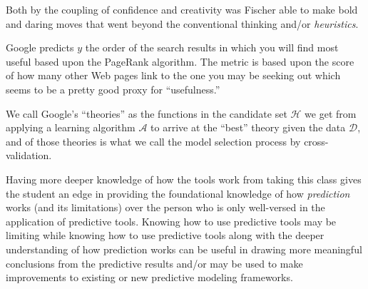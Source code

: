 \documentclass[12pt]{article}
\begin{document}
\begin{enumerate}

\begin{tcolorbox}[colback=white, sharp corners]
Both by the coupling of confidence and creativity was Fischer able to make bold and daring moves that went beyond the conventional thinking and/or \emph{heuristics}.
\end{tcolorbox}



\begin{tcolorbox}[colback=white, sharp corners]
Google predicts $y$ the order of the search results in which you will find most useful based upon the PageRank algorithm. The metric is based upon the score of how many other Web pages link to the one you may be seeking out which seems to be a pretty good proxy for ``usefulness.''
\end{tcolorbox}



\begin{tcolorbox}[colback=white, sharp corners]
We call Google's ``theories'' as the functions in the candidate set $\mathcal{H}$ we get from applying a learning algorithm $\mathcal{A}$ to arrive at the ``best'' theory given the data $\mathcal{D}$, and  of those theories is what we call the model selection process by cross-validation. 
\end{tcolorbox}



\begin{tcolorbox}[colback=white, sharp corners]
Having more deeper knowledge of how the tools work from taking this class gives the student an edge in providing the foundational knowledge of how \emph{prediction} works (and its limitations) over the person who is only well-versed in the application of predictive tools. Knowing how to use predictive tools may be limiting while knowing how to use predictive tools along with the deeper understanding of how prediction works can be useful in drawing more meaningful conclusions from the predictive results and/or may be used to make improvements to existing or new predictive modeling frameworks. 
\end{tcolorbox}



\end{enumerate}
\end{document}
